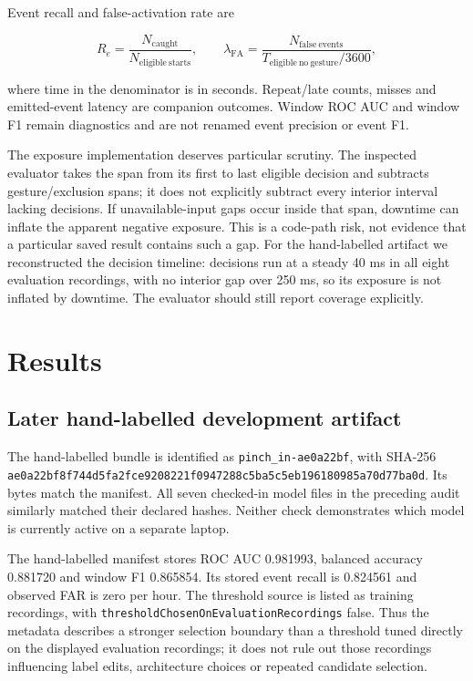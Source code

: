 Event recall and false-activation rate are

\[
R_e=\frac{N_{\mathrm{caught}}}{N_{\mathrm{eligible\ starts}}},\qquad
\lambda_{\mathrm{FA}}=\frac{N_{\mathrm{false\ events}}}{T_{\mathrm{eligible\ no\ gesture}}/3600},
\]

where time in the denominator is in seconds. Repeat/late counts, misses and emitted-event latency are companion outcomes. Window ROC AUC and window F1 remain diagnostics and are not renamed event precision or event F1.

The exposure implementation deserves particular scrutiny. The inspected evaluator takes the span from its first to last eligible decision and subtracts gesture/exclusion spans; it does not explicitly subtract every interior interval lacking decisions. If unavailable-input gaps occur inside that span, downtime can inflate the apparent negative exposure. This is a code-path risk, not evidence that a particular saved result contains such a gap. For the hand-labelled artifact we reconstructed the decision timeline: decisions run at a steady 40 ms in all eight evaluation recordings, with no interior gap over 250 ms, so its exposure is not inflated by downtime. The evaluator should still report coverage explicitly.

\section{Results}\label{results}

\subsection{Later hand-labelled development artifact}\label{later-hand-labelled-development-artifact}

The hand-labelled bundle is identified as \nolinkurl{pinch_in-ae0a22bf}, with SHA-256 \nolinkurl{ae0a22bf8f744d5fa2fce9208221f0947288c5ba5c5eb196180985a70d77ba0d}. Its bytes match the manifest. All seven checked-in model files in the preceding audit similarly matched their declared hashes. Neither check demonstrates which model is currently active on a separate laptop.

The hand-labelled manifest stores ROC AUC 0.981993, balanced accuracy 0.881720 and window F1 0.865854. Its stored event recall is 0.824561 and observed FAR is zero per hour. The threshold source is listed as training recordings, with \nolinkurl{thresholdChosenOnEvaluationRecordings} false. Thus the metadata describes a stronger selection boundary than a threshold tuned directly on the displayed evaluation recordings; it does not rule out those recordings influencing label edits, architecture choices or repeated candidate selection.

